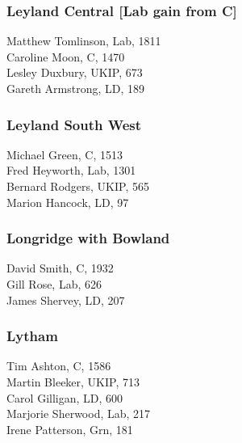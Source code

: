 \documentclass[a4paper,openany,10pt]{book}
\begin{document}
\subsubsection*{Leyland Central \hspace*{\fill}\nolinebreak[1]%
\enspace\hspace*{\fill}
[Lab gain from C]}



Matthew Tomlinson, Lab, 1811\\
Caroline Moon, C, 1470\\
Lesley Duxbury, UKIP, 673\\
Gareth Armstrong, LD, 189\\


\subsubsection*{Leyland South West}



Michael Green, C, 1513\\
Fred Heyworth, Lab, 1301\\
Bernard Rodgers, UKIP, 565\\
Marion Hancock, LD, 97\\


\subsubsection*{Longridge with Bowland}



David Smith, C, 1932\\
Gill Rose, Lab, 626\\
James Shervey, LD, 207\\


\subsubsection*{Lytham}



Tim Ashton, C, 1586\\
Martin Bleeker, UKIP, 713\\
Carol Gilligan, LD, 600\\
Marjorie Sherwood, Lab, 217\\
Irene Patterson, Grn, 181\\
\end{document}
